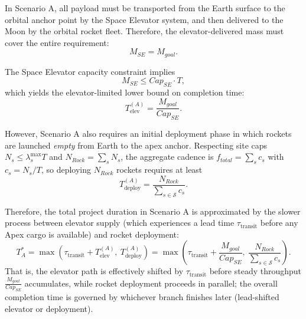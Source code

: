 ﻿\documentclass{mcmthesis}
\begin{document}
In Scenario A, all payload must be transported from the Earth surface to the
orbital anchor point by the Space Elevator system, and then delivered to the
Moon by the orbital rocket fleet. Therefore, the elevator-delivered mass must
cover the entire requirement:
\begin{equation}
M_{SE} = M_{goal}.
\end{equation}

The Space Elevator capacity constraint implies
\begin{equation}
M_{SE} \le Cap_{SE}\cdot T,
\end{equation}
which yields the elevator-limited lower bound on completion time:
\begin{equation}
T_{\text{elev}}^{(A)} = \frac{M_{goal}}{Cap_{SE}}.
\end{equation}

However, Scenario A also requires an initial deployment phase in which rockets are
launched \emph{empty} from Earth to the apex anchor. Respecting site caps $N_s\le\lambda_s^{\text{max}}T$ and $N_{Rock}=\sum_s N_s$, the aggregate cadence is $f_{total}=\sum_s c_s$ with $c_s=N_s/T$, so deploying $N_{Rock}$ rockets requires at least
\begin{equation}
T_{\text{deploy}}^{(A)}=\frac{N_{Rock}}{\sum_{s\in\mathcal{S}} c_s}.
\end{equation}

Therefore, the total project duration in Scenario A is approximated by the slower
process between elevator supply (which experiences a lead time $\tau_{\text{transit}}$ before any Apex cargo is available) and rocket deployment:
\begin{equation}
T_A^{*}=\max\!\left(\tau_{\text{transit}}+T_{\text{elev}}^{(A)},\ T_{\text{deploy}}^{(A)}\right)
=\max\!\left(\tau_{\text{transit}}+\frac{M_{goal}}{Cap_{SE}},\ \frac{N_{Rock}}{\sum_{s\in\mathcal{S}} c_s}\right).
\end{equation}
That is, the elevator path is effectively shifted by $\tau_{\text{transit}}$ before steady throughput $\frac{M_{goal}}{Cap_{SE}}$ accumulates, while rocket deployment proceeds in parallel; the overall completion time is governed by whichever branch finishes later (lead-shifted elevator or deployment).
\end{document}
